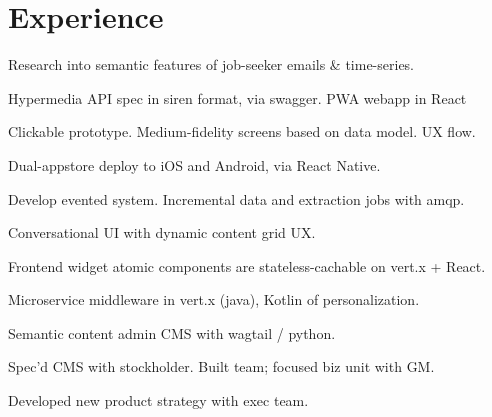 \documentclass[letterpaper]{deedy-resume} %
\begin{document}
\begin{minipage}[t]{0.66\textwidth} %


\section{Experience}



\vspace{\topsep} %
\begin{tightitemize}
\item Research into semantic features of job-seeker emails \& time-series.
\item Hypermedia API spec in siren format, via swagger. PWA webapp in React
\item Clickable prototype. Medium-fidelity screens based on data model. UX flow.
\item Dual-appstore deploy to iOS and Android, via React Native.
\item Develop evented system. Incremental data and extraction jobs with amqp.
\end{tightitemize}

\sectionspace %



\vspace{\topsep} %
Conversational UI with dynamic content grid UX.
\begin{tightitemize}
\item Frontend widget atomic components are stateless-cachable on vert.x + React.
\item Microservice middleware in vert.x (java), Kotlin of personalization.
\item Semantic content admin CMS with wagtail / python.
\item Spec’d CMS with stockholder. Built team; focused biz unit with GM.
\item Developed new product strategy with exec team.
\end{tightitemize}


\end{minipage}
\end{document}
